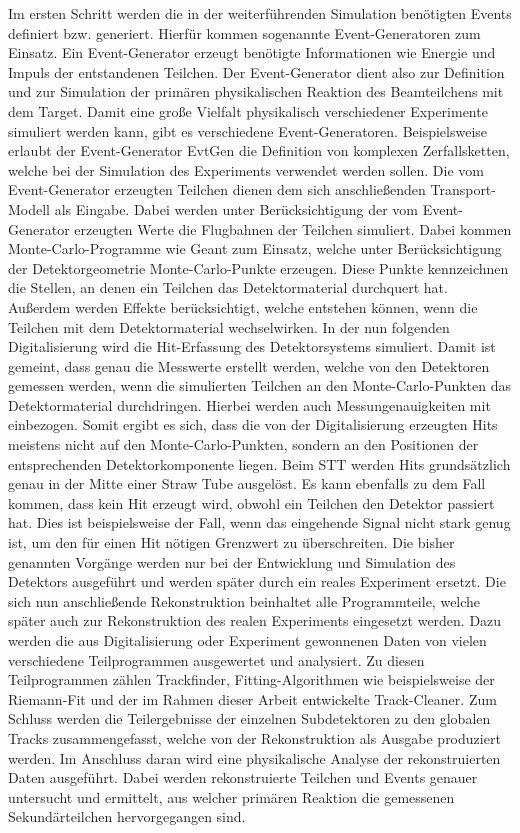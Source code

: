 Im ersten Schritt werden die in der weiterführenden Simulation benötigten Events definiert bzw. generiert. Hierfür kommen sogenannte Event-Generatoren zum Einsatz. Ein Event-Generator erzeugt benötigte Informationen wie Energie und Impuls der entstandenen Teilchen. Der Event-Generator dient also zur Definition und zur Simulation der primären physikalischen Reaktion des Beamteilchens mit dem Target. Damit eine große Vielfalt physikalisch verschiedener Experimente simuliert werden kann, gibt es verschiedene Event-Generatoren. Beispielsweise erlaubt der Event-Generator EvtGen die Definition von komplexen Zerfallsketten, welche bei der Simulation des Experiments verwendet werden sollen. Die vom Event-Generator erzeugten Teilchen dienen dem sich anschließenden Transport-Modell als Eingabe. Dabei werden unter Berücksichtigung der vom Event-Generator erzeugten Werte die Flugbahnen der Teilchen simuliert. Dabei kommen Monte-Carlo-Programme wie Geant zum Einsatz, welche unter Berücksichtigung der Detektorgeometrie Monte-Carlo-Punkte erzeugen. Diese Punkte kennzeichnen die Stellen, an denen ein Teilchen das Detektormaterial durchquert hat. Außerdem werden Effekte berücksichtigt, welche entstehen können, wenn die Teilchen mit dem Detektormaterial wechselwirken. In der nun folgenden Digitalisierung wird die Hit-Erfassung des Detektorsystems simuliert. Damit ist gemeint, dass genau die Messwerte erstellt werden, welche von den Detektoren gemessen werden, wenn die simulierten Teilchen an den Monte-Carlo-Punkten das Detektormaterial durchdringen. Hierbei werden auch Messungenauigkeiten mit einbezogen. Somit ergibt es sich, dass die von der Digitalisierung erzeugten Hits meistens nicht auf den Monte-Carlo-Punkten, sondern an den Positionen der entsprechenden Detektorkomponente liegen. Beim STT werden Hits grundsätzlich genau in der Mitte einer Straw Tube ausgelöst. Es kann ebenfalls zu dem Fall kommen, dass kein Hit erzeugt wird, obwohl ein Teilchen den Detektor passiert hat. Dies ist beispielsweise der Fall, wenn das eingehende Signal nicht stark genug ist, um den für einen Hit nötigen Grenzwert zu überschreiten. Die bisher genannten Vorgänge werden nur bei der Entwicklung und Simulation des Detektors ausgeführt und werden später durch ein reales Experiment ersetzt. Die sich nun anschließende Rekonstruktion beinhaltet alle Programmteile, welche später auch zur Rekonstruktion des realen Experiments eingesetzt werden. Dazu werden die aus Digitalisierung oder Experiment gewonnenen Daten von vielen verschiedene Teilprogrammen ausgewertet und analysiert. Zu diesen Teilprogrammen zählen Trackfinder, Fitting-Algorithmen wie beispielsweise der Riemann-Fit und der im Rahmen dieser Arbeit entwickelte Track-Cleaner. Zum Schluss werden die Teilergebnisse der einzelnen Subdetektoren zu den globalen Tracks zusammengefasst, welche von der Rekonstruktion als Ausgabe produziert werden. Im Anschluss daran wird eine physikalische Analyse der rekonstruierten Daten ausgeführt. Dabei werden rekonstruierte Teilchen und Events genauer untersucht und ermittelt, aus welcher primären Reaktion die gemessenen Sekundärteilchen hervorgegangen sind.

